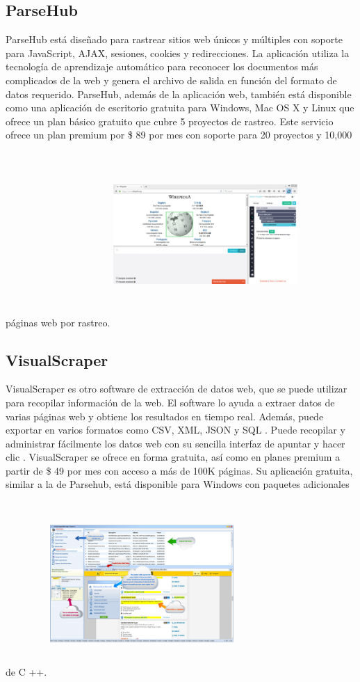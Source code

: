 \documentclass[twoside,twocolumn]{article}
\begin{document}
\subsection{ParseHub}
ParseHub está diseñado para rastrear sitios web únicos y múltiples con soporte para 
JavaScript, AJAX, sesiones, cookies y redirecciones. La aplicación utiliza la tecnología
 de aprendizaje automático para reconocer 
los documentos más complicados de la web y genera 
el archivo de salida en función del formato de datos requerido.
ParseHub, además de la aplicación web, también está disponible
 como una aplicación de escritorio gratuita para Windows, 
 Mac OS X y Linux que ofrece un plan básico gratuito que cubre 5 proyectos de rastreo. 
 Este servicio ofrece un plan premium por 
 \$ 89 por mes con soporte para 20 proyectos y 10,000 páginas web por rastreo.
 \includegraphics[width=7cm, height=7cm]{imagenes/6.png}

\subsection{VisualScraper}
VisualScraper es otro software de extracción de datos web,
 que se puede utilizar para recopilar información de la web.
  El software lo ayuda a extraer datos de varias páginas web y 
  obtiene los resultados en tiempo real. Además, puede exportar
   en varios formatos como CSV, XML, JSON y SQL .
Puede recopilar y administrar fácilmente los datos web con su 
sencilla interfaz de apuntar y hacer clic . VisualScraper se ofrece
 en forma gratuita, así como en planes premium a partir de \$
  49 por mes con acceso a más de 100K páginas. Su aplicación gratuita,
   similar a la de Parsehub, está disponible para Windows con paquetes
    adicionales de C ++.
    \includegraphics[width=7cm, height=7cm]{imagenes/7.png}
\end{document}
